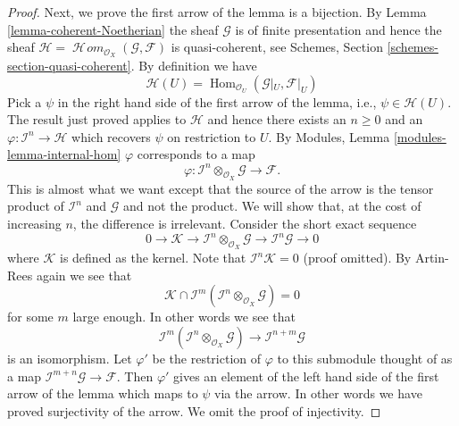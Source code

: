 \documentclass[10pt,a4paper]{amsart}
\theoremstyle{plain}
\theoremstyle{definition}
\theoremstyle{remark}
\numberwithin{equation}{subsection}
\def\Hom{\mathop{\mathrm{Hom}}\nolimits}
\def\SheafHom{\mathop{\mathcal{H}\!\mathit{om}}\nolimits}
\begin{document}
\begin{proof}
\medskip\noindent
Next, we prove the first arrow of the lemma is a bijection.
By Lemma \ref{lemma-coherent-Noetherian} the sheaf $\mathcal{G}$
is of finite presentation and hence the sheaf
$\mathcal{H} = \SheafHom_{\mathcal{O}_X}(\mathcal{G}, \mathcal{F})$
is quasi-coherent, see
Schemes, Section \ref{schemes-section-quasi-coherent}.
By definition we have
$$
\mathcal{H}(U)
=
\Hom_{\mathcal{O}_U}(\mathcal{G}|_U, \mathcal{F}|_U)
$$
Pick a $\psi$ in the right hand side of the first arrow of the
lemma, i.e.,  $\psi \in \mathcal{H}(U)$. The result just proved applies
to $\mathcal{H}$ and hence there exists an $n \geq 0$ and an
$\varphi : \mathcal{I}^n \to \mathcal{H}$ which recovers
$\psi$ on restriction to $U$. By
Modules, Lemma \ref{modules-lemma-internal-hom}
$\varphi$ corresponds to a map
$$
\varphi :
\mathcal{I}^n \otimes_{\mathcal{O}_X} \mathcal{G}
\longrightarrow
\mathcal{F}.
$$
This is almost what we want except that the source of the arrow
is the tensor product of $\mathcal{I}^n$ and $\mathcal{G}$
and not the product. We will show that, at the cost of increasing $n$,
the difference is irrelevant. Consider the short exact sequence
$$
0 \to \mathcal{K} \to
\mathcal{I}^n \otimes_{\mathcal{O}_X} \mathcal{G} \to
\mathcal{I}^n\mathcal{G} \to 0
$$
where $\mathcal{K}$ is defined as the kernel. Note that
$\mathcal{I}^n\mathcal{K} = 0$ (proof omitted). By Artin-Rees
again we see that
$$
\mathcal{K}
\cap
\mathcal{I}^m(\mathcal{I}^n \otimes_{\mathcal{O}_X} \mathcal{G})
=
0
$$
for some $m$ large enough. In other words we see that
$$
\mathcal{I}^m(\mathcal{I}^n \otimes_{\mathcal{O}_X} \mathcal{G})
\longrightarrow
\mathcal{I}^{n + m}\mathcal{G}
$$
is an isomorphism. Let $\varphi'$ be the restriction of
$\varphi$ to this submodule thought of as a map
$\mathcal{I}^{m + n}\mathcal{G} \to \mathcal{F}$.
Then $\varphi'$ gives an element
of the left hand side of the first arrow of the lemma which
maps to $\psi$ via the arrow. In other words we have proved surjectivity
of the arrow. We omit the proof of injectivity.
\end{proof}
\end{document}
